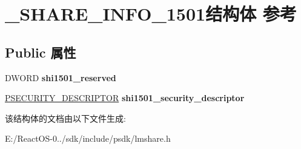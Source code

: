 \hypertarget{struct___s_h_a_r_e___i_n_f_o__1501}{}\section{\+\_\+\+S\+H\+A\+R\+E\+\_\+\+I\+N\+F\+O\+\_\+1501结构体 参考}
\label{struct___s_h_a_r_e___i_n_f_o__1501}
\subsection*{Public 属性}
\begin{DoxyCompactItemize}
\item 
\mbox{\label{struct___s_h_a_r_e___i_n_f_o__1501_a8ce3af6855014e3702856f77d137d90b}} 
D\+W\+O\+RD {\bfseries shi1501\+\_\+reserved}
\item 
\mbox{\label{struct___s_h_a_r_e___i_n_f_o__1501_ac844e37b583f1de9536ca21fb8be861f}} 
\hyperlink{struct___s_e_c_u_r_i_t_y___d_e_s_c_r_i_p_t_o_r}{P\+S\+E\+C\+U\+R\+I\+T\+Y\+\_\+\+D\+E\+S\+C\+R\+I\+P\+T\+OR} {\bfseries shi1501\+\_\+security\+\_\+descriptor}
\end{DoxyCompactItemize}


该结构体的文档由以下文件生成\+:\begin{DoxyCompactItemize}
\item 
E\+:/\+React\+O\+S-\/0../sdk/include/psdk/lmshare.\+h\end{DoxyCompactItemize}
